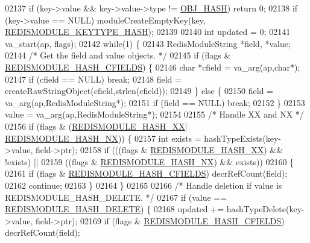 \begin{DoxyCode}
{{{02137     \textcolor{keywordflow}{if} (key->value && key->value->type != \hyperlink{server_8h_a87c05ba4f7f36741864277f02a4423fb}{OBJ\_HASH}) \textcolor{keywordflow}{return} 0;
02138     \textcolor{keywordflow}{if} (key->value == NULL) moduleCreateEmptyKey(key,
      \hyperlink{redismodule_8h_ac019575ac57520c325597e2fb54c5b71}{REDISMODULE\_KEYTYPE\_HASH});
02139 
02140     \textcolor{keywordtype}{int} updated = 0;
02141     va\_start(ap, flags);
02142     \textcolor{keywordflow}{while}(1) \{
02143         RedisModuleString *field, *value;
02144         \textcolor{comment}{/* Get the field and value objects. */}
02145         \textcolor{keywordflow}{if} (flags & \hyperlink{redismodule_8h_a0b45cc86dbd926d0af5d59a5f4c0e0da}{REDISMODULE\_HASH\_CFIELDS}) \{
02146             \textcolor{keywordtype}{char} *cfield = va\_arg(ap,\textcolor{keywordtype}{char}*);
02147             \textcolor{keywordflow}{if} (cfield == NULL) \textcolor{keywordflow}{break};
02148             field = createRawStringObject(cfield,strlen(cfield));
02149         \} \textcolor{keywordflow}{else} \{
02150             field = va\_arg(ap,RedisModuleString*);
02151             \textcolor{keywordflow}{if} (field == NULL) \textcolor{keywordflow}{break};
02152         \}
02153         value = va\_arg(ap,RedisModuleString*);
02154 
02155         \textcolor{comment}{/* Handle XX and NX */}
02156         \textcolor{keywordflow}{if} (flags & (\hyperlink{redismodule_8h_a004820ba3dee8c209e6d19267b5c6fb9}{REDISMODULE\_HASH\_XX}|
      \hyperlink{redismodule_8h_a11aa350d4db460e8416beaf263ee2e42}{REDISMODULE\_HASH\_NX})) \{
02157             \textcolor{keywordtype}{int} exists = hashTypeExists(key->value, field->ptr);
02158             \textcolor{keywordflow}{if} (((flags & \hyperlink{redismodule_8h_a004820ba3dee8c209e6d19267b5c6fb9}{REDISMODULE\_HASH\_XX}) && !exists) ||
02159                 ((flags & \hyperlink{redismodule_8h_a11aa350d4db460e8416beaf263ee2e42}{REDISMODULE\_HASH\_NX}) && exists))
02160             \{
02161                 \textcolor{keywordflow}{if} (flags & \hyperlink{redismodule_8h_a0b45cc86dbd926d0af5d59a5f4c0e0da}{REDISMODULE\_HASH\_CFIELDS}) decrRefCount(field);
02162                 \textcolor{keywordflow}{continue};
02163             \}
02164         \}
02165 
02166         \textcolor{comment}{/* Handle deletion if value is REDISMODULE\_HASH\_DELETE. */}
02167         \textcolor{keywordflow}{if} (value == \hyperlink{redismodule_8h_ab4a99f96be3384e33942c82817bde501}{REDISMODULE\_HASH\_DELETE}) \{
02168             updated += hashTypeDelete(key->value, field->ptr);
02169             \textcolor{keywordflow}{if} (flags & \hyperlink{redismodule_8h_a0b45cc86dbd926d0af5d59a5f4c0e0da}{REDISMODULE\_HASH\_CFIELDS}) decrRefCount(field);
}}}
\end{DoxyCode}
